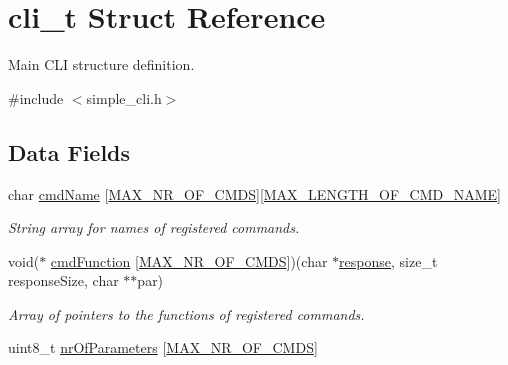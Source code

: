 \hypertarget{structcli__t}{\section{cli\+\_\+t Struct Reference}
\label{structcli__t}
}


Main C\+L\+I structure definition.  




{\ttfamily \#include $<$simple\+\_\+cli.\+h$>$}

\subsection*{Data Fields}
\begin{DoxyCompactItemize}
\item 
\hypertarget{structcli__t_a3179aea6fe53e20e272e45f6921cabc5}{char \hyperlink{structcli__t_a3179aea6fe53e20e272e45f6921cabc5}{cmd\+Name} \mbox{[}\hyperlink{group___s_i_m_p_l_e___c_l_i_gac5c0c1eca89291c3464b4ff294b13f05}{M\+A\+X\+\_\+\+N\+R\+\_\+\+O\+F\+\_\+\+C\+M\+D\+S}\mbox{]}\mbox{[}\hyperlink{group___s_i_m_p_l_e___c_l_i_gabd0278272d66be331cab5531626c475d}{M\+A\+X\+\_\+\+L\+E\+N\+G\+T\+H\+\_\+\+O\+F\+\_\+\+C\+M\+D\+\_\+\+N\+A\+M\+E}\mbox{]}}\label{structcli__t_a3179aea6fe53e20e272e45f6921cabc5}

\begin{DoxyCompactList}\small\item\em String array for names of registered commands. \end{DoxyCompactList}\item 
\hypertarget{structcli__t_a90bde48bbf1f7683b171c00e69d356a9}{void($\ast$ \hyperlink{structcli__t_a90bde48bbf1f7683b171c00e69d356a9}{cmd\+Function} \mbox{[}\hyperlink{group___s_i_m_p_l_e___c_l_i_gac5c0c1eca89291c3464b4ff294b13f05}{M\+A\+X\+\_\+\+N\+R\+\_\+\+O\+F\+\_\+\+C\+M\+D\+S}\mbox{]})(char $\ast$\hyperlink{structcli__t_a00caea38300895956a4d6b7e90e95232}{response}, size\+\_\+t response\+Size, char $\ast$$\ast$par)}\label{structcli__t_a90bde48bbf1f7683b171c00e69d356a9}

\begin{DoxyCompactList}\small\item\em Array of pointers to the functions of registered commands. \end{DoxyCompactList}\item 
\hypertarget{structcli__t_aeadecdddb1fab1aef408600b88426f92}{uint8\+\_\+t \hyperlink{structcli__t_aeadecdddb1fab1aef408600b88426f92}{nr\+Of\+Parameters} \mbox{[}\hyperlink{group___s_i_m_p_l_e___c_l_i_gac5c0c1eca89291c3464b4ff294b13f05}{M\+A\+X\+\_\+\+N\+R\+\_\+\+O\+F\+\_\+\+C\+M\+D\+S}\mbox{]}}\label{structcli__t_aeadecdddb1fab1aef408600b88426f92}


\end{DoxyCompactItemize}
